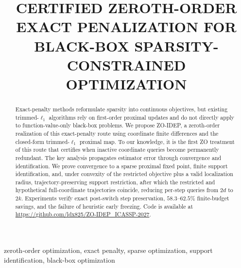 \documentclass{article}
\title{CERTIFIED ZEROTH-ORDER EXACT PENALIZATION FOR BLACK-BOX SPARSITY-CONSTRAINED OPTIMIZATION}
\begin{document}
\ninept
\setlength{\abovedisplayskip}{4pt plus 1pt minus 1pt}
\setlength{\belowdisplayskip}{4pt plus 1pt minus 1pt}
\setlength{\abovedisplayshortskip}{3pt plus 1pt}
\setlength{\belowdisplayshortskip}{3pt plus 1pt minus 1pt}
\maketitle
\vspace{-0.75em}

\begin{abstract}
Exact-penalty methods reformulate sparsity into continuous objectives, but existing trimmed-$\ell_1$ algorithms rely on first-order proximal updates and do not directly apply to function-value-only black-box problems. We propose ZO-IDEP, a zeroth-order realization of this exact-penalty route using coordinate finite differences and the closed-form trimmed-$\ell_1$ proximal map. To our knowledge, it is the first ZO treatment of this route that certifies when inactive coordinate queries become permanently redundant. The key analysis propagates estimator error through convergence and identification. We prove convergence to a sparse proximal fixed point, finite support identification, and, under convexity of the restricted objective plus a valid localization radius, trajectory-preserving support restriction, after which the restricted and hypothetical full-coordinate trajectories coincide, reducing per-step queries from $2d$ to $2k$. Experiments verify exact post-switch step preservation, $58.3$--$62.5\%$ finite-budget savings, and the failure of heuristic early freezing.
Code is available at \url{https://github.com/ldx825/ZO-IDEP_ICASSP-2027}.
\end{abstract}

\begin{keywords}
zeroth-order optimization, exact penalty, sparse optimization, support identification, black-box optimization
\end{keywords}
\end{document}

